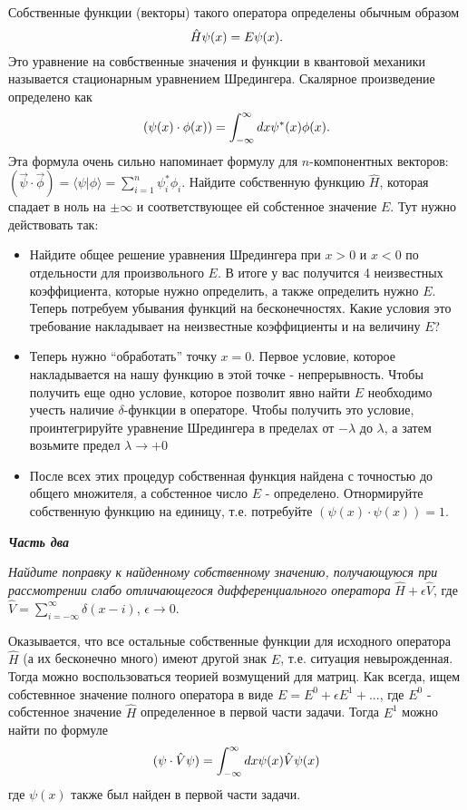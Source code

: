 \documentclass[a4paper,12pt]{article}
\begin{document}
\noindent Собственные функции (векторы) такого оператора определены обычным образом
\begin{equation}\notag
\hat{H}\psi(x)	=E\psi(x).
\end{equation}
\noindent Это уравнение на совбственные значения и функции в квантовой механики называется стационарным уравнением Шредингера. Скалярное произведение определено как
\begin{equation}\notag
(\psi(x)\cdot\phi(x))	=\int_{-\infty}^{\infty}dx\psi^{*}(x)\phi(x).
\end{equation}
\noindent Эта формула очень сильно напоминает формулу для $n$-компонентных векторов: $(\vec{\psi}\cdot\vec{\phi})=\langle\psi|\phi\rangle=\sum_{i=1}^{n}\psi_{i}^{*}\phi_{i}$. Найдите собственную функцию $\hat{H}$, которая спадает в ноль на $\pm\infty$ и соответствующее ей собстенное значение $E$. Тут нужно действовать так:
\begin{itemize}
\item Найдите общее решение уравнения Шредингера при $x>0$ и $x<0$ по отдельности для произвольного $E$. В итоге у вас получится 4 неизвестных коэффициента, которые нужно определить, а также определить нужно $E$. Теперь потребуем убывания функций на бесконечностях. Какие условия это требование накладывает на неизвестные коэффициенты и на величину $E$? 

\item Теперь нужно “обработать” точку $x=0$. Первое условие, которое накладывается на нашу функцию в этой точке - непрерывность. Чтобы получить еще одно условие, которое позволит явно найти $E$ необходимо учесть наличие $\delta$-функции в операторе. Чтобы получить это условие, проинтегрируйте уравнение Шредингера в пределах от $-\lambda$ до $\lambda$, а затем возьмите предел $\lambda\rightarrow+0$

\item После всех этих процедур собственная функция найдена с точностью до общего множителя, а собстенное число $E$ - определено. Отнормируйте собственную функцию на единицу, т.е. потребуйте $(\psi(x)\cdot\psi(x))=1$.
\end{itemize}
\noindent \textit{\textbf{Часть два}}

\noindent \textit{Найдите поправку к найденному собственному значению, получающуюся при рассмотрении слабо отличающегося дифференциального оператора} $\hat{H}+\epsilon\hat{V}$, где $\hat{V}=\sum_{i=-\infty}^{\infty}\delta(x-i)$, $\epsilon\rightarrow 0$.

\noindent Оказывается, что все остальные собственные функции для исходного оператора $\hat{H}$ (а их бесконечно много) имеют другой знак $E$, т.е. ситуация невырожденная. Тогда можно воспользоваться теорией возмущений для матриц. Как всегда, ищем собстевнное значение полного оператора в виде $E=E^{0}+\epsilon E^{1}+...$, где $E^{0}$ - собстенное значение $\hat{H}$ определенное в первой части задачи. Тогда $E^{1}$ можно найти по формуле
\begin{equation}\notag
(\psi\cdot\hat{V}\psi)	=\int_{-\infty}^{\infty}dx\psi(x)\hat{V}\psi(x)
\end{equation}
\noindent где $\psi(x)$ также был найден в первой части задачи.
\end{document}
